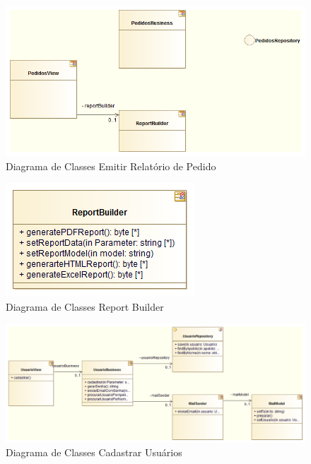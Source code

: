 \begin{figure}[h!]
 \centering
 \includegraphics[scale=0.5]{capitulo02/diagramaClassesEmitirRelatorioPedido.png}
 \caption{Diagrama de Classes Emitir Relatório de Pedido}
\end{figure}

\begin{figure}[h!]
 \centering
 \includegraphics[scale=0.5]{capitulo02/diagramaClassesReportBuilder.png}
 \caption{Diagrama de Classes Report Builder}
\end{figure}

\begin{landscape}
\begin{figure}[h!]
 \centering
 \includegraphics[scale=0.5]{capitulo02/diagramaClassesCadastrarUsuarios.png}
 \caption{Diagrama de Classes Cadastrar Usuários}
\end{figure}
\end{landscape}

